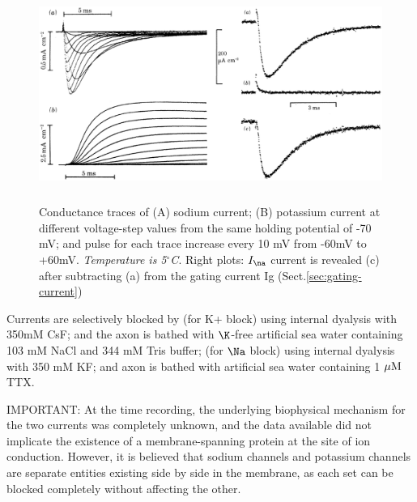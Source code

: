 \begin{figure}[hbt]
  \centerline{\includegraphics[height=7cm,
    angle=0]{./images/conductance-traces-Na-K.eps}}
  \caption{Conductance traces of (A) sodium current; (B) potassium current at
  different voltage-step values from the same holding potential of -70
  mV; and pulse for each trace increase every 10 mV from -60mV to +60mV. 
  {\it Temperature is 5$^\circ$C}.  Right plots: $I_\na$ current is revealed (c) after subtracting (a) from the
  gating current Ig	(Sect.\ref{sec:gating-current})}
\label{fig:conductance-traces-Na-K}
\end{figure}

\begin{mdframed}

Currents are selectively blocked by (for K+ block) using internal dyalysis with
350mM CsF; and the axon is bathed with $\K$-free artificial sea water containing
103 mM NaCl and 344 mM Tris buffer; (for $\Na$ block) using internal dyalysis
with 350 mM KF; and axon is bathed with artificial sea water containing 1 ${\mu\text{M}}$
TTX.
\end{mdframed}


IMPORTANT: At the time recording, the underlying biophysical mechanism
for the two currents was completely unknown, and the data available did not
implicate the existence of a membrane-spanning protein at the site of ion
conduction. However, it is believed that sodium channels and potassium channels
are separate entities existing side by side  in the membrane, as each set can be
blocked completely without affecting the other.

